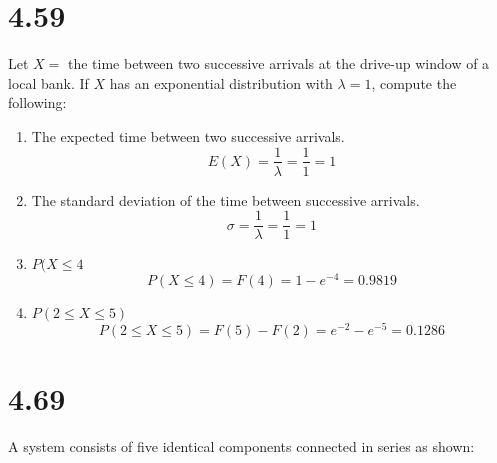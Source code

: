 \documentclass[letterpaper,12pt,fleqn]{article}
\renewcommand{\l}{\lambda}
\renewcommand{\o}{\sigma}
\begin{document}
\section*{4.59}

Let \(X=\) the time between two successive arrivals at the drive-up window of a local bank.  If \(X\) has an exponential
distribution with \(\l=1\), compute the following:
\begin{enumerate}[label={\alph*)}]
\item The expected time between two successive arrivals.
  \[E(X)=\frac{1}{\l}=\frac{1}{1}=1\]
\item The standard deviation of the time between successive arrivals.
  \[\o=\frac{1}{\l}=\frac{1}{1}=1\]
\item \(P(X\le4\)
  \[P(X\le4)=F(4)=1-e^{-4}=0.9819\]
\item \(P(2\le X\le5)\)
  \[P(2\le X\le5)=F(5)-F(2)=e^{-2}-e^{-5}=0.1286\]
\end{enumerate}

\section*{4.69}

A system consists of five identical components connected in series as shown:

\bigskip


\bigskip
\end{document}
